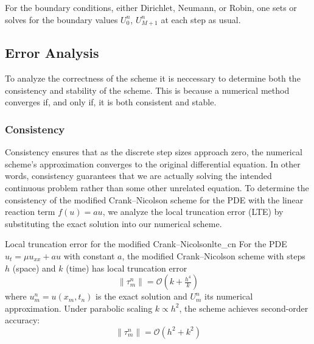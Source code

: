 
For the boundary conditions, either Dirichlet, Neumann, or Robin, one sets or solves for the boundary
values \(U_0^n\), \(U_{M+1}^n\) at each step as usual.

\subsection{Error Analysis}
To analyze the correctness of the scheme it is neccessary to determine both the consistency and stability of the scheme.
This is because a numerical method converges if, and only if, it is both consistent and stable.


\subsubsection{Consistency}
Consistency ensures that as the discrete step sizes approach zero, the numerical scheme's approximation converges to the original differential equation.
In other words, consistency guarantees that we are actually solving the intended continuous problem rather than some other unrelated equation.
To determine the consistency of the modified Crank--Nicolson scheme for the PDE with the linear reaction term $f(u) = au$,
we analyze the local truncation error (LTE) by substituting the exact solution into our numerical scheme.

\begin{theorem}{Local truncation error for the modified Crank--Nicolson}{lte_cn}
  For the PDE $u_t = \mu u_{xx} + au$ with constant $a$, the modified Crank--Nicolson scheme with steps $h$ (space)
  and $k$ (time) has local truncation error
  \[
    \|\tau_m^n\| = \mathcal{O}\!\left(k +\tfrac{h^4}{k}\right)
  \]
  where $u_m^n = u(x_m,t_n)$ is the exact solution and $U_m^n$ its numerical approximation.
  Under parabolic scaling $k \propto h^2$, the scheme achieves second-order accuracy:
  \[
    \|\tau_m^n\| = \mathcal{O}\!\left(h^2 + k^2\right)
  \]
\end{theorem}


